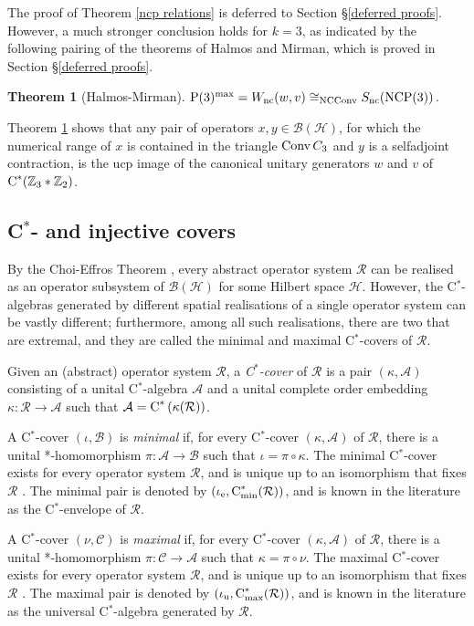 \documentclass{amsart}
\newtheorem{theorem}{Theorem}[section]
\theoremstyle{definition}
\theoremstyle{remark}
\newcommand{\B}{\mathcal{B}}
\renewcommand{\H}{\mathcal{H}}
\newcommand\osr{{\mathcal R}}
\newcommand{\A}{\mathcal{A}}                    %
\newcommand\cstar{{\textrm C}^*}                              %
\newcommand\cstare{{\textrm C}_{\textrm{min}}^*}              %
\numberwithin{equation}{section}
\begin{document}
The proof of Theorem \ref{ncp relations} is deferred to Section \S\ref{deferred proofs}. However, a much stronger conclusion holds for $k=3$,
as indicated by the following pairing of the theorems of Halmos and Mirman, which is proved in Section \S\ref{deferred proofs}.

\begin{theorem}[Halmos-Mirman]\label{halmos-mirman}
$\mbox{\textrm P}(3)^{\textrm{max}} = W_{\textrm{nc}}(w,v) \cong_{{\textrm{NCConv}}} S_{\textrm{nc}}(\mbox{\textrm{NCP}}(3))$.
\end{theorem}

Theorem \ref{halmos-mirman} shows that any pair of operators $x,y\in\B(\H)$, for which the numerical range of $x$ is contained in the triangle  $\mbox{\textrm Conv}\,C_3$ and $y$ is 
a selfadjoint contraction, is the ucp image of the canonical unitary generators $w$ and $v$ of $\cstar(\mathbb Z_3*\mathbb Z_2)$.

\subsection{C$^*$- and injective covers}

By the Choi-Effros Theorem \cite{choi--effros1977}, every abstract operator system $\osr$ can be realised as an operator subsystem of $\B(\H)$
for some Hilbert space $\H$. However, the C$^*$-algebras generated by different spatial realisations of a single operator system can be vastly different;
furthermore, among all such realisations, there are two that are extremal, and they are called the minimal and maximal C$^*$-covers of $\osr$.

Given an (abstract) operator system $\osr$, a \emph{C$^*$-cover} of $\osr$ is a pair $(\kappa, \A)$ consisting of a unital C$^*$-algebra $\A$
and a unital complete order embedding $\kappa:\osr\rightarrow\A$ such that $\A=\cstar\left(\kappa(\osr) \right)$.

A C$^*$-cover $(\iota,\B)$ is \emph{minimal} if, for every C$^*$-cover $(\kappa, \A)$ of $\osr$, there is a unital *-homomorphism
$\pi:\A\rightarrow\B$ such that $\iota=\pi\circ\kappa$. The minimal C$^*$-cover exists for every operator system $\osr$, and is unique
up to an isomorphism that fixes $\osr$ \cite{hamana1979b}. The minimal pair is denoted by $\left(\iota_{\textrm e},\cstare(\osr)\right)$,
and is known in the literature as the C$^*$-envelope of $\osr$.

A C$^*$-cover $(\nu,\mathcal C)$ is \emph{maximal} if, for every C$^*$-cover $(\kappa, \A)$ of $\osr$, there is a unital *-homomorphism
$\pi:\mathcal C\rightarrow\A$ such that $\kappa=\pi\circ\nu$. The maximal C$^*$-cover exists for every operator system $\osr$, and is unique
up to an isomorphism that fixes $\osr$ \cite{kirchberg--wassermann1998}. The maximal pair is denoted by 
$\left(\iota_{\textrm u},\cstar_{\textrm{max}}(\osr)\right)$,
and is known in the literature as the universal C$^*$-algebra generated by $\osr$.
\end{document}
